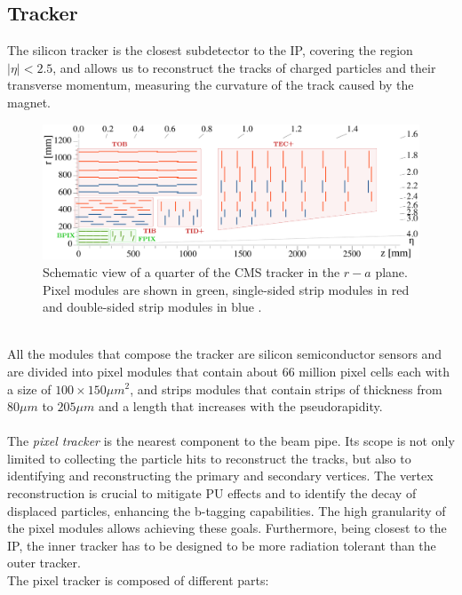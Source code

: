 \subsection{Tracker}
The silicon tracker \cite{CastaldiPatriceSiegristJean-EudesAugustin1997TheReport,CMS_pixel_Phase1_2012} is the closest subdetector to the IP, covering the region $|\eta|<2.5$, and allows us to reconstruct the tracks of charged particles and their transverse momentum, measuring the curvature of the track caused by the magnet.
\begin{figure}[h!]
    \centering
    \includegraphics[width=0.73\linewidth]{fig//chap03-cms/CMS_tracker_Phase1_edit.pdf}
    \caption{Schematic view of a quarter of the CMS tracker in the $r-a$ plane. Pixel modules are shown in green, single-sided strip modules in red and double-sided strip modules in blue \cite{DPGResultsTRKTWiki}.}
    \label{fig:cms_tracker}
\end{figure}
\\
All the modules that compose the tracker are silicon semiconductor sensors and are divided into pixel modules that contain about 66 million pixel cells each with a size of $100 \times 150 \mu m^2$, and strips modules that contain strips of thickness from $80 \mu m$ to $205 \mu m$ and a length that increases with the pseudorapidity.\\
\\
The \emph{pixel tracker} \cite{Adam2021TheUpgrade} is the nearest component to the beam pipe. Its scope is not only limited to collecting the particle hits to reconstruct the tracks, but also to identifying and reconstructing the primary and secondary vertices. The vertex reconstruction is crucial to mitigate PU effects and to identify the decay of displaced particles, enhancing the b-tagging capabilities.
The high granularity of the pixel modules allows achieving these goals. Furthermore, being closest to the IP, the inner tracker has to be designed to be more radiation tolerant than the outer tracker.\\
The pixel tracker is composed of different parts:
